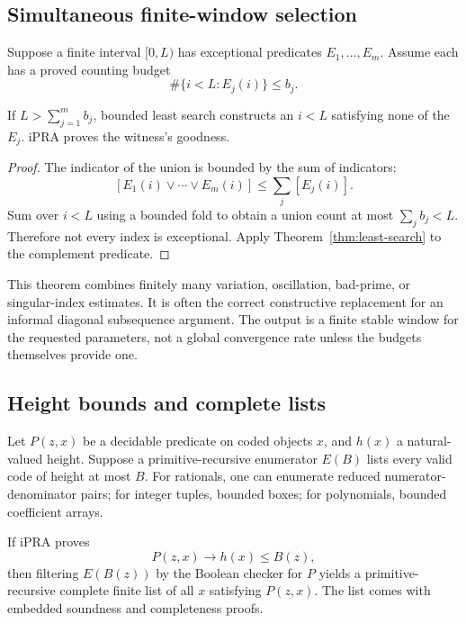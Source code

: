 \subsection{Simultaneous finite-window selection}

Suppose a finite interval \([0,L)\) has exceptional predicates
\(E_1,\ldots,E_m\).  Assume each has a proved counting budget
\[
 \#\{i<L:E_j(i)\}\leq b_j.
\]

\begin{theorem}
\label{thm:finite-window}
If \(L>\sum_{j=1}^m b_j\), bounded least search constructs an
\(i<L\) satisfying none of the \(E_j\).  iPRA proves the witness's goodness.
\end{theorem}

\begin{proof}
The indicator of the union is bounded by the sum of indicators:
\[
 [E_1(i)\vee\cdots\vee E_m(i)]
 \leq\sum_j[E_j(i)].
\]
Sum over \(i<L\) using a bounded fold to obtain a union count at most
\(\sum_jb_j<L\).  Therefore not every index is exceptional.  Apply
Theorem~\ref{thm:least-search} to the complement predicate.
\end{proof}

This theorem combines finitely many variation, oscillation, bad-prime, or
singular-index estimates.  It is often the correct constructive replacement
for an informal diagonal subsequence argument.  The output is a finite stable
window for the requested parameters, not a global convergence rate unless the
budgets themselves provide one.

\subsection{Height bounds and complete lists}

Let \(P(z,x)\) be a decidable predicate on coded objects \(x\), and
\(h(x)\) a natural-valued height.  Suppose a primitive-recursive enumerator
\(E(B)\) lists every valid code of height at most \(B\).  For rationals, one
can enumerate reduced numerator-denominator pairs; for integer tuples,
bounded boxes; for polynomials, bounded coefficient arrays.

\begin{theorem}
\label{thm:height-to-list}
If iPRA proves
\[
 P(z,x)\longrightarrow h(x)\leq B(z),
\]
then filtering \(E(B(z))\) by the Boolean checker for \(P\) yields a
primitive-recursive complete finite list of all \(x\) satisfying \(P(z,x)\).
The list comes with embedded soundness and completeness proofs.
\end{theorem}

